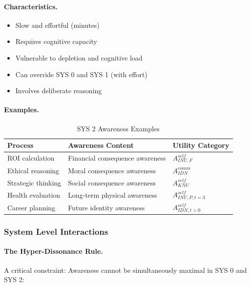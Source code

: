 \paragraph{Characteristics.}
\begin{itemize}
\item Slow and effortful (minutes)
\item Requires cognitive capacity
\item Vulnerable to depletion and cognitive load
\item Can override SYS 0 and SYS 1 (with effort)
\item Involves deliberate reasoning
\end{itemize}

\paragraph{Examples.}
\begin{table}[htbp]
\centering
\caption{SYS 2 Awareness Examples}
\label{tab:sys2-examples}
\renewcommand{\arraystretch}{1.3}
\begin{tabular}{@{}lll@{}}
\toprule
\textbf{Process} & \textbf{Awareness Content} & \textbf{Utility Category} \\
\midrule
ROI calculation & Financial consequence awareness & $A^{self}_{INU,F}$ \\
Ethical reasoning & Moral consequence awareness & $A^{comm}_{IDN}$ \\
Strategic thinking & Social consequence awareness & $A^{self}_{KNU}$ \\
Health evaluation & Long-term physical awareness & $A^{self}_{INU,P,t=3}$ \\
Career planning & Future identity awareness & $A^{self}_{IDN,t>0}$ \\
\bottomrule
\end{tabular}
\end{table}

\subsubsection{System Level Interactions}

\paragraph{The Hyper-Dissonance Rule.}
A critical constraint: Awareness cannot be simultaneously maximal in SYS 0 
and SYS 2:

